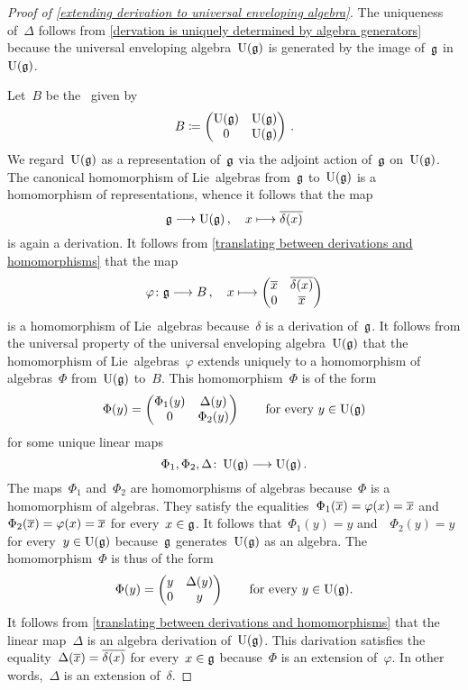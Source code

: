 \begin{proof}[Proof of \cref{extending derivation to universal enveloping algebra}]
	The uniqueness of~$\Delta$ follows from \cref{dervation is uniquely determined by algebra generators} because the universal enveloping algebra~$\operatorname{U}(\mathfrak{g})$ is generated by the image of~$\mathfrak{g}$ in~$\operatorname{U}(\mathfrak{g})$.

	Let~$B$ be the~\algebra{$\kf$} given by
	\[
		B
		\coloneqq
		\begin{pmatrix}
			\operatorname{U}(\mathfrak{g})  & \operatorname{U}(\mathfrak{g}) \\
			0             & \operatorname{U}(\mathfrak{g})
		\end{pmatrix} \,.
	\]
	We regard~$\operatorname{U}(\mathfrak{g})$ as a representation of~$\mathfrak{g}$ via the adjoint action of~$\mathfrak{g}$ on~$\operatorname{U}(\mathfrak{g})$.
	The canonical homomorphism of Lie~algebras from~$\mathfrak{g}$ to~$\operatorname{U}(\mathfrak{g})$ is a homomorphism of representations, whence it follows that the map
	\[
		\glie
		\to
		\Univ(\glie) \,,
		\quad
		x
		\mapsto
		\class{\delta(x)}
	\]
	is again a derivation.
	It follows from \cref{translating between derivations and homomorphisms} that the map
	\[
		\varphi
		\colon
		\glie
		\to
		B \,,
		\quad
		x
		\mapsto
		\begin{pmatrix}
			\class{x} & \class{\delta(x)} \\
			0         & \class{x}
		\end{pmatrix}
	\]
	is a homomorphism of Lie~algebras because~$\delta$ is a derivation of~$\mathfrak{g}$.
	It follows from the universal property of the universal enveloping algebra~$\operatorname{U}(\mathfrak{g})$ that the homomorphism of Lie~algebras~$\varphi$ extends uniquely to a homomorphism of algebras~$\Phi$ from~$\operatorname{U}(\mathfrak{g})$ to~$B$.
	This homomorphism~$\Phi$ is of the form
	\[
		\Phi(y)
		=
		\begin{pmatrix}
			\Phi_1(y) & \Delta(y) \\
			0         & \Phi_2(y)
		\end{pmatrix}
		\qquad
		\text{for every~$y \in \operatorname{U}(\mathfrak{g})$}
	\]
	for some unique linear maps
	\[
		\Phi_1, \Phi_2, \Delta
		\colon
		\Univ(\glie)
		\to
		\Univ(\glie) \,.
	\]
	The maps~$\Phi_1$ and~$\Phi_2$ are homomorphisms of algebras because~$\Phi$ is a homomorphism of algebras.
	They satisfy the equalities~$\Phi_1(\overline{x}) = \varphi(x) = \overline{x}$ and~$\Phi_2(\overline{x}) = \varphi(x) = \overline{x}$ for every~$x \in \mathfrak{g}$.
	It follows that~$\Phi_1(y) = y$ and~~$\Phi_2(y) = y$ for every~$y \in \operatorname{U}(\mathfrak{g})$ because~$\mathfrak{g}$ generates~$\operatorname{U}(\mathfrak{g})$ as an algebra.
	The homomorphism~$\Phi$ is thus of the form
	\[
		\Phi(y)
		=
		\begin{pmatrix}
			y & \Delta(y) \\
			0 & y
		\end{pmatrix}
		\qquad
		\text{for every~$y \in \operatorname{U}(\mathfrak{g})$.}
	\]
	It follows from \cref{translating between derivations and homomorphisms} that the linear map~$\Delta$ is an algebra derivation of~$\operatorname{U}(\mathfrak{g})$.
	This darivation satisfies the equality~$\Delta(\overline{x}) = \overline{\delta(x)}$ for every~$x \in \mathfrak{g}$ because~$\Phi$ is an extension of~$\varphi$.
	In other words,~$\Delta$ is an extension of~$\delta$.
\end{proof}


